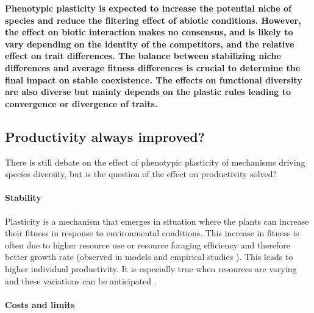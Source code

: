 

\textbf{Phenotypic plasticity is expected to increase the potential niche of species and reduce the filtering effect of abiotic conditions. However, the effect on biotic interaction makes no consensus, and is likely to vary depending on the identity of the competitors, and the relative effect on trait differences. The balance between stabilizing niche differences and average fitness differences is crucial to determine the final impact on stable coexistence. The effects on functional diversity are also diverse but mainly depends on the plastic rules leading to convergence or divergence of traits.}


\subsection{Productivity always improved?}

There is still debate on the effect of phenotypic plasticity of mechanisms driving species diversity, but is the question of the effect on productivity solved?

\paragraph{Stability}

Plasticity is a mechanism that emerges in situation where the plants can increase their fitness in response to environmental conditions. This increase in fitness is often due to higher resource use or resource foraging efficiency and therefore better growth rate (observed in models \parencite{maire_plasticity_2013} and empirical studies \parencite{ hamann_evidence_2016}). This leads to higher individual productivity. It is especially true when resources are varying and these variations can be anticipated  \cite{richter_phenotypic_2012}.





\paragraph{Costs and limits}

